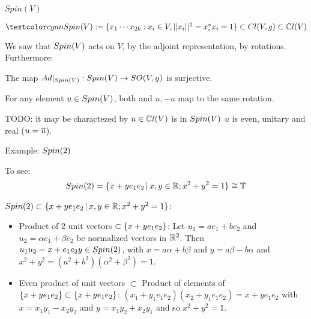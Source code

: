 \begin{frame}{$Spin(V)$} %

    \begin{Definition} $\defn{\spinv} := \set{x_1 \cdots x_{2k}: x_i \in V, ||x_i||^2 = x_i^* x_i = 1} \subset \clvg \subset \cclv$
    \end{Definition}
    
    We saw that $Spin(V)$ acts on $V$, by the adjoint representation, by rotations. Furthermore:
    
    \begin{proposition}
    The map $Ad|_{Spin(V)}: Spin(V) \to SO(V, g)$ is surjective.
    
    For any element $u \in Spin(V)$, both and $u, -u$ map to the same rotation.
    \end{proposition}
    
    TODO: it may be charactezed by $u \in \mathbb C l(V)$ is in $Spin(V)$ \iff $u$ is even, unitary and real ($u = \overline{u}$).
\end{frame}

\begin{frame}{Example: $Spin(2)$} %
    
    To see: \[Spin(2) = \{x + y e_1 e_2 \,|\, x, y \in \mathbb R;  x^2 + y^2 = 1\} \cong \mathbb T\]
    
    $Spin(2) \subset \{x + y e_1 e_2 \,|\, x, y \in \mathbb R;  x^2 + y^2 = 1\}$:
        \begin{itemize}
            
        \item Product of $2$ unit vectors $\subset \{x + y e_1 e_2\}$: Let $u_1 = a e_1 + b e_2$ and $u_2 = \alpha e_1 + \beta e_2$ be normalized vectors in $\mathbb R^2$. Then $u_1 u_2 = x + e_1 e_2 y \in Spin(2)$, with $x = a \alpha + b \beta$ and $y = a \beta  - b \alpha$ and $x^2 + y^2 = (a^2 + b^2)(\alpha^2 + \beta^2) = 1$.
        
        \item Even product of unit vectors $\subset$ Product of elements of $\{x + y e_1 e_2\} \subset \{x + y e_1 e_2\}$: $(x_1 + y_1 e_1 e_2)(x_2 + y_1 e_1 e_2) = x + y e_1 e_2$ with $x = x_1 y_1 - x_2 y_2$ and $y = x_1 y_2 + x_2 y_1$ and so $x^2 + y^2 = 1$.
            
        \end{itemize}
    
\end{frame}

